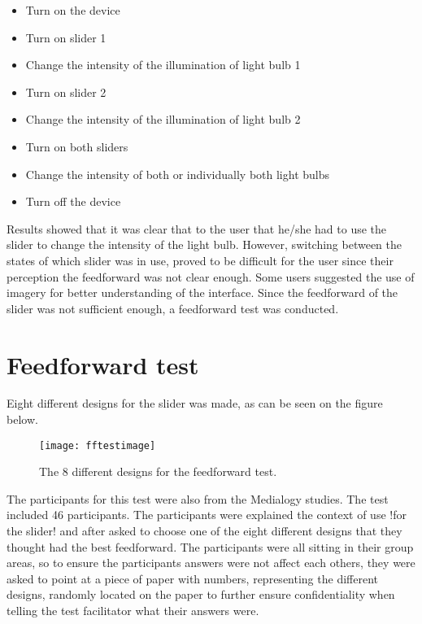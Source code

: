 \begin{itemize}
\item Turn on the device
\item Turn on slider 1
\item Change the intensity of the illumination of light bulb 1
\item Turn on slider 2
\item Change the intensity of the illumination of light bulb 2
\item Turn on both sliders
\item Change the intensity of both or individually both light bulbs
\item Turn off the device
\end{itemize}


Results showed that it was clear that to the user that he/she had to use the slider to change the intensity of the light bulb. However, switching between the states of which slider was in use, proved to be difficult for the user since their perception the feedforward was not clear enough. Some users suggested the use of imagery for better understanding of the interface.
Since the feedforward of the slider was not sufficient enough, a feedforward test was conducted.

\section{Feedforward test}
Eight different designs for the slider was made, as can be seen on the figure below.

\begin{figure}[!h] 
\centering
\texttt{[image: fftestimage]}
\caption{\label{fig:fftestimage} The 8 different designs for the feedforward test.}
\end{figure}

The participants for this test were also from the Medialogy studies. The test included 46 participants. The participants were explained the context of use !for the slider! and after asked to choose one of the eight different designs that they thought had the best feedforward. The participants were all sitting in their group areas, so to ensure the participants answers were not affect each others, they were asked to point at a piece of paper with numbers, representing the different designs, randomly located on the paper to further ensure confidentiality when telling the test facilitator what their answers were. 

